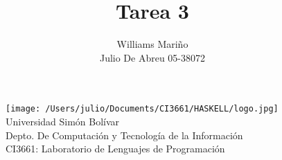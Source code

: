 \documentclass[12pt,a4paper,spanish]{article}
\begin{document}
\begin{figure}
  \centering
    \texttt{[image: /Users/julio/Documents/CI3661/HASKELL/logo.jpg]}
     \\ Universidad Sim\'on Bol\'ivar
     \\ Depto. De Computaci\'on y Tecnolog\'ia de la Informaci\'on
     \\ CI3661: Laboratorio de Lenguajes de Programaci\'on 
\end{figure} 

\title{Tarea 3}
\author{Williams Mari\~no\\
        Julio De Abreu 05-38072}

\maketitle
\newpage
\end{document}
